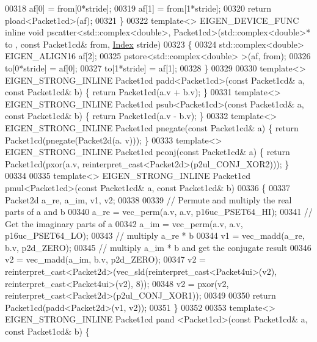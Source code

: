 \begin{DoxyCode}
00318   af[0] = from[0*stride];
00319   af[1] = from[1*stride];
00320   \textcolor{keywordflow}{return} pload<Packet1cd>(af);
00321 \}
00322 \textcolor{keyword}{template}<> EIGEN\_DEVICE\_FUNC \textcolor{keyword}{inline} \textcolor{keywordtype}{void} pscatter<std::complex<double>, Packet1cd>(std::complex<double>* to
      , \textcolor{keyword}{const} Packet1cd& from, \hyperlink{namespace_eigen_a62e77e0933482dafde8fe197d9a2cfde}{Index} stride)
00323 \{
00324   std::complex<double> EIGEN\_ALIGN16 af[2];
00325   pstore<std::complex<double> >(af, from);
00326   to[0*stride] = af[0];
00327   to[1*stride] = af[1];
00328 \}
00329 
00330 \textcolor{keyword}{template}<> EIGEN\_STRONG\_INLINE Packet1cd padd<Packet1cd>(\textcolor{keyword}{const} Packet1cd& a, \textcolor{keyword}{const} Packet1cd& b) \{ \textcolor{keywordflow}{return} 
      Packet1cd(a.v + b.v); \}
00331 \textcolor{keyword}{template}<> EIGEN\_STRONG\_INLINE Packet1cd psub<Packet1cd>(\textcolor{keyword}{const} Packet1cd& a, \textcolor{keyword}{const} Packet1cd& b) \{ \textcolor{keywordflow}{return} 
      Packet1cd(a.v - b.v); \}
00332 \textcolor{keyword}{template}<> EIGEN\_STRONG\_INLINE Packet1cd pnegate(\textcolor{keyword}{const} Packet1cd& a) \{ \textcolor{keywordflow}{return} Packet1cd(pnegate(Packet2d(a.
      v))); \}
00333 \textcolor{keyword}{template}<> EIGEN\_STRONG\_INLINE Packet1cd pconj(\textcolor{keyword}{const} Packet1cd& a) \{ \textcolor{keywordflow}{return} Packet1cd(pxor(a.v, 
      reinterpret\_cast<Packet2d>(p2ul\_CONJ\_XOR2))); \}
00334 
00335 \textcolor{keyword}{template}<> EIGEN\_STRONG\_INLINE Packet1cd pmul<Packet1cd>(\textcolor{keyword}{const} Packet1cd& a, \textcolor{keyword}{const} Packet1cd& b)
00336 \{
00337   Packet2d a\_re, a\_im, v1, v2;
00338 
00339   \textcolor{comment}{// Permute and multiply the real parts of a and b}
00340   a\_re = vec\_perm(a.v, a.v, p16uc\_PSET64\_HI);
00341   \textcolor{comment}{// Get the imaginary parts of a}
00342   a\_im = vec\_perm(a.v, a.v, p16uc\_PSET64\_LO);
00343   \textcolor{comment}{// multiply a\_re * b}
00344   v1 = vec\_madd(a\_re, b.v, p2d\_ZERO);
00345   \textcolor{comment}{// multiply a\_im * b and get the conjugate result}
00346   v2 = vec\_madd(a\_im, b.v, p2d\_ZERO);
00347   v2 = \textcolor{keyword}{reinterpret\_cast<}Packet2d\textcolor{keyword}{>}(vec\_sld(reinterpret\_cast<Packet4ui>(v2), reinterpret\_cast<Packet4ui>(v2),
       8));
00348   v2 = pxor(v2, reinterpret\_cast<Packet2d>(p2ul\_CONJ\_XOR1));
00349 
00350   \textcolor{keywordflow}{return} Packet1cd(padd<Packet2d>(v1, v2));
00351 \}
00352 
00353 \textcolor{keyword}{template}<> EIGEN\_STRONG\_INLINE Packet1cd pand   <Packet1cd>(\textcolor{keyword}{const} Packet1cd& a, \textcolor{keyword}{const} Packet1cd& b) \{ \textcolor{keywordflow}{
}
\end{DoxyCode}
